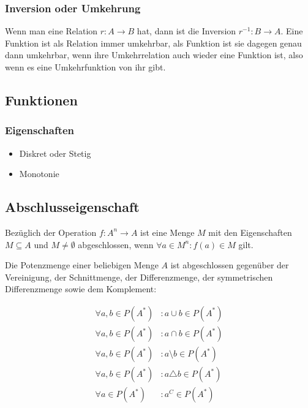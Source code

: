 \documentclass[../main.tex]{subfiles}
\begin{document}
            \subsubsection{Inversion oder Umkehrung}
                Wenn man eine Relation $r\colon A \rightarrow B$ hat, dann ist die Inversion $r^{-1}\colon B \rightarrow A$. Eine Funktion ist als Relation immer umkehrbar, als Funktion ist sie dagegen genau dann umkehrbar, wenn ihre Umkehrrelation auch wieder eine Funktion ist, also wenn es eine Umkehrfunktion von ihr gibt.                
                    
                    
        \subsection{Funktionen}
            \subsubsection{Eigenschaften}
                \begin{itemize}
                    \item Diskret oder Stetig
                    \item Monotonie
                \end{itemize}
                
        
        \subsection{Abschlusseigenschaft}
            Bezüglich der Operation $f: A^n \rightarrow A$ ist eine Menge $M$ mit den Eigenschaften $M \subseteq A$ und $M \not= \emptyset$ abgeschlossen, wenn $\forall a \in M^n\colon f(a) \in M$ gilt.
            
            Die Potenzmenge einer beliebigen Menge $A$ ist abgeschlossen gegenüber der Vereinigung, der Schnittmenge, der Differenzmenge, der symmetrischen Differenzmenge sowie dem Komplement:
            
            \begin{subequations}
                \begin{align}
                    \forall a,b \in P(A^*)&\colon a \cup b \in P(A^*)\\
                    \forall a,b \in P(A^*)&\colon a \cap b \in P(A^*)\\
                    \forall a,b \in P(A^*)&\colon a \setminus b \in P(A^*)\\
                    \forall a,b \in P(A^*)&\colon a \triangle b \in P(A^*)\\
                    \forall a \in P(A^*)&\colon a^C \in P(A^*)\\
                \end{align}
            \end{subequations}
        
\end{document}
